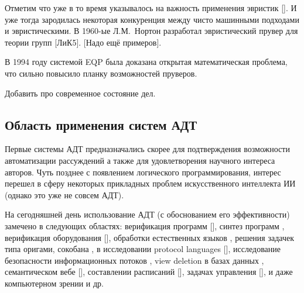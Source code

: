 Отметим что уже в то время указывалось на важность применения эвристик []. И уже тогда зародилась некоторая конкуренция между чисто машинными подходами и эвристическими. В 1960-ые Л.М.~Нортон разработал эвристический прувер для теории групп [ЛиК5]. [Надо ещё примеров].

В 1994 году системой EQP была доказана открытая математическая проблема, что сильно повысило планку возможностей пруверов.


Добавить про современное состояние дел. %



\subsection{Область применения систем АДТ}
Первые системы АДТ предназначались скорее для подтверждения возможности автоматизации рассуждений а также для удовлетворения научного интереса авторов. Чуть позднее с появлением логического программирования, интерес перешел в сферу некоторых прикладных проблем искусственного интеллекта ИИ (однако это уже не совсем АДТ).

На сегодняшней день использование АДТ (с обоснованием его эффективности) замечено в следующих областях: верификация программ [], синтез программ \cite{Butakov1}, верификация оборудования [], обработки естественных языков \cite{ATP_NLP}, решения задачек типа оригами, сокобана \cite{Origami}, в исследовании protocol languages [], исследование безопасности информационных потоков \cite{ATP_Flow}, view deletion в базах данных \cite{ATP_DB}, семантическом вебе [], составлении расписаний [], задачах управления [], и даже компьютерном зрении \cite{ATP_Vision} и др.


